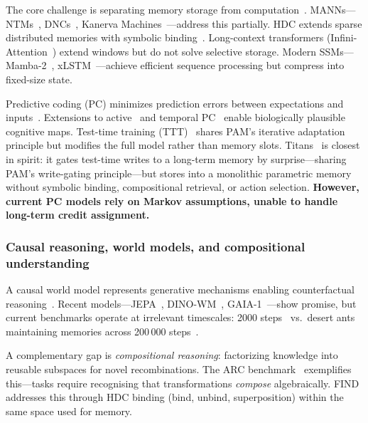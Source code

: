 The core challenge is separating memory storage from computation~\cite{gemici2017generative,gallistel2011memory}. MANNs---NTMs~\cite{graves2014ntm}, DNCs~\cite{graves2016dnc}, Kanerva Machines~\cite{wu2018kanerva}---address this partially. HDC extends sparse distributed memories with symbolic binding~\cite{kanerva2009hyperdimensional,ma2022hyperbox}. Long-context transformers (Infini-Attention~\cite{munkhdalai2024infini}) extend windows but do not solve selective storage. Modern SSMs---Mamba-2~\cite{dao2024mamba2}, xLSTM~\cite{beck2024xlstm}---achieve efficient sequence processing but compress into fixed-size state.

Predictive coding (PC) minimizes prediction errors between expectations and inputs~\cite{millidge2022theoretical,friston2010free}. Extensions to active~\cite{rao2023active} and temporal PC~\cite{millidge2024temporal} enable biologically plausible cognitive maps. Test-time training (TTT)~\cite{sun2024ttt} shares PAM's iterative adaptation principle but modifies the full model rather than memory slots. Titans~\cite{behrouz2025titans} is closest in spirit: it gates test-time writes to a long-term memory by surprise---sharing PAM's write-gating principle---but stores into a monolithic parametric memory without symbolic binding, compositional retrieval, or action selection. \textbf{However, current PC models rely on Markov assumptions, unable to handle long-term credit assignment.}

\subsubsection*{Causal reasoning, world models, and compositional understanding}

A causal world model represents generative mechanisms enabling counterfactual reasoning~\cite{scholkopf2021causal,richens2024robust}. Recent models---JEPA~\cite{drozdov2024jepa}, DINO-WM~\cite{zhou2024dinowm}, GAIA-1~\cite{hu2023gaia1}---show promise, but current benchmarks operate at irrelevant timescales: 2000 steps~\cite{deng2023structured} vs.\ desert ants maintaining memories across 200\,000 steps~\cite{piantadosi2024desert}.

A complementary gap is \textit{compositional reasoning}: factorizing knowledge into reusable subspaces for novel recombinations. The ARC benchmark~\cite{chollet2019arc} exemplifies this---tasks require recognising that transformations \textit{compose} algebraically. FIND addresses this through HDC binding (bind, unbind, superposition) within the same space used for memory.

